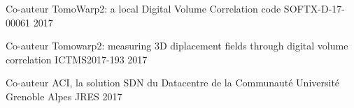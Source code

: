 

\begin{cventries}

  \cventrynodescr
    {Co-auteur} %
    {TomoWarp2: a local Digital Volume Correlation code} %
    {SOFTX-D-17-00061} %
    {2017} %

  \cventrynodescr
    {Co-auteur} %
    {Tomowarp2: measuring 3D diplacement fields through digital volume correlation} %
    {ICTMS2017-193} %
    {2017} %

  \cventrynodescr
    {Co-auteur} %
    {ACI, la solution SDN du Datacentre de la Communauté Université Grenoble Alpes} %
    {JRES} %
    {2017} %

\end{cventries}
